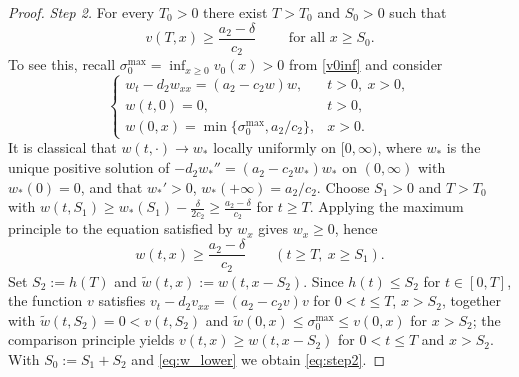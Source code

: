 \documentclass[reqno]{amsart}
\theoremstyle{plain}
\theoremstyle{definition}
\theoremstyle{remark}
\begin{document}
\begin{proof}
	\textit{Step 2.} For every $T_0>0$ there exist $T>T_0$ and $S_0>0$ such that
	\begin{equation}\label{eq:step2}
		v(T, x) \ge \frac{a_2-\delta}{c_2} \qquad\text{ for all } x\ge S_0 .
	\end{equation}
	To see this, recall $\sigma_0^{\max}=\inf_{x\ge0}v_0(x)>0$ from \eqref{v0inf}
	and consider
	\begin{equation}\label{aux1}
		\begin{cases}
			w_t - d_2w_{xx} = (a_2 - c_2w)w, & t > 0, ~ x > 0,\\
			w(t, 0) = 0, & t > 0,\\
			w(0,x) = \min\{\sigma_0^{\max},a_2/c_2\}, & x > 0.
		\end{cases}
	\end{equation}
	It is classical that $w(t,\cdot)\to w_*$ locally uniformly on $[0,\infty)$,
	where $w_*$ is the unique positive solution of $-d_2w_*''=(a_2-c_2w_*)w_*$ on
	$(0,\infty)$ with $w_*(0)=0$, and that $w_*'>0$, $w_*(+\infty)=a_2/c_2$.
	Choose $S_1>0$ and $T>T_0$ with
	$w(t,S_1)\ge w_*(S_1)-\frac{\delta}{2c_2}\ge\frac{a_2-\delta}{c_2}$ for
	$t\ge T$. Applying the maximum principle to the equation satisfied by $w_x$
	gives $w_x\ge0$, hence
	\begin{equation}\label{eq:w_lower}
		w(t,x)\ge\frac{a_2-\delta}{c_2}\qquad (t\ge T,\ x\ge S_1).
	\end{equation}
	Set $S_2:=h(T)$ and $\tilde w(t,x):=w(t,x-S_2)$. Since $h(t)\le S_2$ for
	$t\in[0,T]$, the function $v$ satisfies
	$v_t-d_2v_{xx}=(a_2-c_2v)v$ for $0<t\le T$, $x>S_2$, together with
	$\tilde w(t,S_2)=0<v(t,S_2)$ and
	$\tilde w(0,x)\le\sigma_0^{\max}\le v(0,x)$ for $x>S_2$; the comparison
	principle yields $v(t,x)\ge w(t,x-S_2)$ for $0<t\le T$ and $x>S_2$. With
	$S_0:=S_1+S_2$ and \eqref{eq:w_lower} we obtain \eqref{eq:step2}.


\end{proof}
\end{document}

